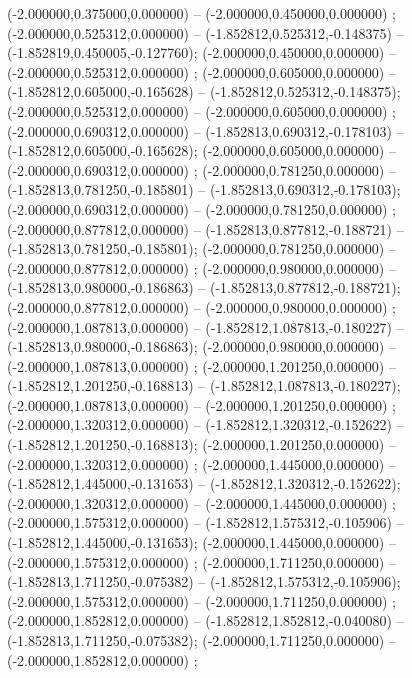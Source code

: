  (-2.000000,0.375000,0.000000) -- (-2.000000,0.450000,0.000000) ;
 (-2.000000,0.525312,0.000000) -- (-1.852812,0.525312,-0.148375) -- (-1.852819,0.450005,-0.127760);
 (-2.000000,0.450000,0.000000) -- (-2.000000,0.525312,0.000000) ;
 (-2.000000,0.605000,0.000000) -- (-1.852812,0.605000,-0.165628) -- (-1.852812,0.525312,-0.148375);
 (-2.000000,0.525312,0.000000) -- (-2.000000,0.605000,0.000000) ;
 (-2.000000,0.690312,0.000000) -- (-1.852813,0.690312,-0.178103) -- (-1.852812,0.605000,-0.165628);
 (-2.000000,0.605000,0.000000) -- (-2.000000,0.690312,0.000000) ;
 (-2.000000,0.781250,0.000000) -- (-1.852813,0.781250,-0.185801) -- (-1.852813,0.690312,-0.178103);
 (-2.000000,0.690312,0.000000) -- (-2.000000,0.781250,0.000000) ;
 (-2.000000,0.877812,0.000000) -- (-1.852813,0.877812,-0.188721) -- (-1.852813,0.781250,-0.185801);
 (-2.000000,0.781250,0.000000) -- (-2.000000,0.877812,0.000000) ;
 (-2.000000,0.980000,0.000000) -- (-1.852813,0.980000,-0.186863) -- (-1.852813,0.877812,-0.188721);
 (-2.000000,0.877812,0.000000) -- (-2.000000,0.980000,0.000000) ;
 (-2.000000,1.087813,0.000000) -- (-1.852812,1.087813,-0.180227) -- (-1.852813,0.980000,-0.186863);
 (-2.000000,0.980000,0.000000) -- (-2.000000,1.087813,0.000000) ;
 (-2.000000,1.201250,0.000000) -- (-1.852812,1.201250,-0.168813) -- (-1.852812,1.087813,-0.180227);
 (-2.000000,1.087813,0.000000) -- (-2.000000,1.201250,0.000000) ;
 (-2.000000,1.320312,0.000000) -- (-1.852812,1.320312,-0.152622) -- (-1.852812,1.201250,-0.168813);
 (-2.000000,1.201250,0.000000) -- (-2.000000,1.320312,0.000000) ;
 (-2.000000,1.445000,0.000000) -- (-1.852812,1.445000,-0.131653) -- (-1.852812,1.320312,-0.152622);
 (-2.000000,1.320312,0.000000) -- (-2.000000,1.445000,0.000000) ;
 (-2.000000,1.575312,0.000000) -- (-1.852812,1.575312,-0.105906) -- (-1.852812,1.445000,-0.131653);
 (-2.000000,1.445000,0.000000) -- (-2.000000,1.575312,0.000000) ;
 (-2.000000,1.711250,0.000000) -- (-1.852813,1.711250,-0.075382) -- (-1.852812,1.575312,-0.105906);
 (-2.000000,1.575312,0.000000) -- (-2.000000,1.711250,0.000000) ;
 (-2.000000,1.852812,0.000000) -- (-1.852812,1.852812,-0.040080) -- (-1.852813,1.711250,-0.075382);
 (-2.000000,1.711250,0.000000) -- (-2.000000,1.852812,0.000000) ;

